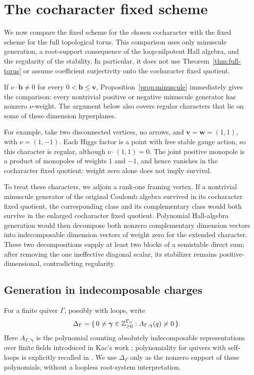 \section{The cocharacter fixed scheme}\label{sec:cocharacters}

We now compare the fixed scheme for the chosen cocharacter with the fixed
scheme for the full topological torus.  This comparison uses only minuscule
generation, a root-support consequence of the loop-nilpotent Hall algebra,
and the regularity of the stability.  In particular, it does not use
Theorem~\ref{thm:full-torus} or assume coefficient surjectivity onto the
cocharacter fixed quotient.

If \(\nu\cdot\mathbf b\ne0\) for every
\(0<\mathbf b\leq\mathbf v\), Proposition~\ref{prop:minuscule} immediately
gives the comparison: every nontrivial positive or negative minuscule
generator has nonzero \(\nu\)-weight.  The argument below also covers
regular characters that lie on some of these dimension hyperplanes.

For example, take two disconnected vertices, no arrows, and
\(\mathbf v=\mathbf w=(1,1)\), with \(\nu=(1,-1)\).
Each Higgs factor is a point with free stable gauge action, so this
character is regular, although \(\nu\cdot(1,1)=0\).
The joint positive monopole is a product of monopoles of weights
\(1\) and \(-1\), and hence vanishes in the cocharacter fixed quotient:
weight zero alone does not imply survival.

To treat these characters, we adjoin a rank-one framing vertex.
If a nontrivial minuscule generator of the original Coulomb algebra
survived in its cocharacter fixed quotient, the corresponding class and
its complementary class would both survive in the enlarged cocharacter
fixed quotient.  Polynomial Hall-algebra generation would then decompose
both nonzero complementary dimension vectors into indecomposable dimension
vectors of weight zero for the extended character.
These two decompositions supply at least two blocks of a semistable direct
sum; after removing the one ineffective diagonal scalar, its stabilizer
remains positive-dimensional, contradicting regularity.

\subsection{Generation in indecomposable charges}

For a finite quiver \(\Gamma\), possibly with loops, write
\[
 \Delta_\Gamma
 =\{\,0\ne\boldsymbol\gamma\in\mathbb Z_{\geq0}^{\Gamma_0}:
                  A_{\Gamma,\boldsymbol\gamma}(q)\ne0\,\}.
\]
Here \(A_{\Gamma,\boldsymbol\gamma}\) is the polynomial counting
absolutely indecomposable representations over finite fields introduced
in Kac's work \cite{Kac83}; polynomiality for quivers with self-loops
is explicitly recalled in \cite[Theorem~1(a) and Remark~4]{Kac19}.
We use \(\Delta_\Gamma\) only as the nonzero support of these polynomials,
without a loopless root-system interpretation.

